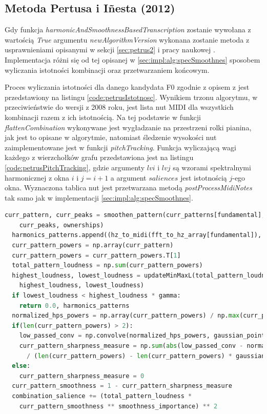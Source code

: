 \documentclass[12pt,a4paper,twoside]{mwart}
\begin{document}
\subsection{Metoda Pertusa i Iñesta (2012)}\label{sec:impl:alg:specSmoothnes:improved}
Gdy funkcja \textit{harmonicAndSmoothnessBasedTranscription} zostanie wywołana z wartością \textit{True} argumentu \textit{newAlgorithmVersion} wykonana zostanie metoda z usprawnieniami opisanymi w sekcji \ref{sec:petrus2} i pracy naukowej \cite{Transcription:Pertus:Inharmonicity2}. Implementacja różni się od tej opisanej w \ref{sec:impl:alg:specSmoothnes} sposobem wyliczania istotności kombinacji oraz przetwarzaniem końcowym.  

Proces wyliczania istotności dla danego kandydata F0 zgodnie z opisem z \cite{Transcription:Pertus:Inharmonicity2} jest przedstawiony na listingu \ref{code:petrusIstotnosc}. Wynikiem trzonu algorytmu, w przeciwieństwie do wersji z 2008 roku, jest lista nut MIDI dla wszystkich kombinacji razem z ich istotnością. Na tej podstawie w funkcji \textit{flattenCombination} wykonywane jest wygładzanie na przestrzeni rolki pianina, jak jest to opisane w algorytmie, natomiast śledzenie wysokości nut zaimplementowane jest w funkcji \textit{pitchTracking}. Funkcja wyliczającą wagi każdego z wierzchołków grafu przedstawiona jest na listingu \ref{code:petrusPitchTracking}, gdzie argumenty $lvi$ i $lvj$ są wzorami spektralnymi harmonicznej z okna $i$ i $j = i + 1$ a argument $saliences$ jest istotnością $j$-ego okna. Wyznaczona tablica nut jest przetwarzana metodą \textit{postProcessMidiNotes} tak samo jak w implementacji \ref{sec:impl:alg:specSmoothnes}.

\begin{lstlisting}[language=Python, caption={Wyliczanie istotności w algorytmie Pertusa i Iñesta (2012)}, captionpos=b, label={code:petrusIstotnosc}, numbers=none]
  curr_pattern, curr_peaks = smoothen_pattern(curr_patterns[fundamental],
    curr_peaks, ownerships)
  harmonics_patterns.append((hz_to_midi(fft_to_hz_array[fundamental]), curr_pattern))
  curr_pattern_powers = np.array(curr_pattern)
  curr_pattern_powers = curr_pattern_powers.T[1]
  total_pattern_loudness = np.sum(curr_pattern_powers)
  highest_loudness, lowest_loudness = updateMinMaxL(total_pattern_loudness,
    highest_loudness, lowest_loudness)
  if lowest_loudness < highest_loudness * gamma:
    return 0.0, harmonics_patterns
  normalized_hps_powers = np.array(curr_pattern_powers) / np.max(curr_pattern_powers)
  if(len(curr_pattern_powers) > 2):
    low_passed_conv = np.convolve(normalized_hps_powers, gaussian_points, 'same')
    curr_pattern_sharpness_measure = np.sum(abs(low_passed_conv - normalized_hps_powers))
      / (len(curr_pattern_powers) - len(curr_pattern_powers) * gaussian_points[1])
  else:
    curr_pattern_sharpness_measure = 0
  curr_pattern_smoothness = 1 - curr_pattern_sharpness_measure
  combination_salience += (total_pattern_loudness *
    curr_pattern_smoothness ** smoothness_importance) ** 2
\end{lstlisting}
\end{document}
